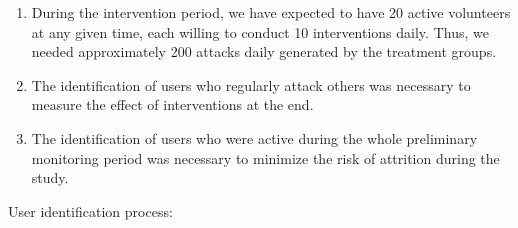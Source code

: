 \documentclass[
  10pt,
  dvipsnames,enabledeprecatedfontcommands]{scrartcl}
\begin{document}
\renewcommand{\labelenumii}{\Roman{enumii}}
 \begin{enumerate}
 \item During the intervention period, we have expected to have 20 active volunteers at any given time, each willing to conduct 10 interventions daily. Thus, we needed approximately 200 attacks daily generated by the treatment groups.
\item The identification of users who regularly attack others was necessary to measure the effect of interventions at the end.
\item The identification of users who were active during the whole preliminary monitoring period was necessary to minimize the risk of attrition during the study. 
 \end{enumerate}

User identification process:
\end{document}
